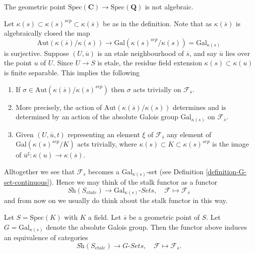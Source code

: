 \begin{example}
\label{example-stupid}
The geometric point
$\text{Spec}(\mathbf{C}) \to \text{Spec}(\mathbf{Q})$
is not algebraic.
\end{example}

\noindent
Let $\kappa(s) \subset \kappa(s)^{sep} \subset \kappa(\overline{s})$
be as in the definition. Note that as $\kappa(\overline{s})$ is algebraically
closed the map
$$
\text{Aut}(\kappa(\overline{s})/\kappa(s))
\longrightarrow
\text{Gal}(\kappa(s)^{sep}/\kappa(s)) = \text{Gal}_{\kappa(s)}
$$
is surjective. Suppose $(U, \overline{u})$ is an
etale neighbourhood of $\overline{s}$, and say $\overline{u}$ lies over
the point $u$ of $U$. Since $U \to S$ is etale, the residue field extension
$\kappa(s) \subset \kappa(u)$ is finite separable.
This implies the following
\begin{enumerate}
\item If $\sigma \in \text{Aut}(\kappa(\overline{s})/\kappa(s)^{sep})$
then $\sigma$ acts trivially on $\mathcal{F}_{\overline{s}}$.
\item More precisely, the action of
$\text{Aut}(\kappa(\overline{s})/\kappa(s))$
determines and is determined by an action of the absolute Galois group
$\text{Gal}_{\kappa(s)}$ on $\mathcal{F}_{\overline{s}}$.
\item Given $(U, \overline{u}, t)$ representing an element $\xi$ of
$\mathcal{F}_{\overline{s}}$ any element of
$\text{Gal}(\kappa(s)^{sep}/K)$ acts trivially, where
$\kappa(s) \subset K \subset \kappa(s)^{sep}$ is the image of
$\overline{u}^\sharp : \kappa(u) \to \kappa(\overline{s})$.
\end{enumerate}
Alltogether we see that $\mathcal{F}_{\overline{s}}$ becomes a
$\text{Gal}_{\kappa(s)}$-set (see
Definition \ref{definition-G-set-continuous}).
Hence we may think of the stalk functor as a functor
$$
\textit{Sh}(S_{etale}) \longrightarrow \text{Gal}_{\kappa(s)}\textit{-Sets},
\quad
\mathcal{F} \longmapsto \mathcal{F}_{\overline{s}}
$$
and from now on we usually do think about the stalk functor in this way.

\begin{theorem}
\label{theorem-equivalence-sheaves-point}
Let $S = \text{Spec}(K)$ with $K$ a field.
Let $\overline{s}$ be a geometric point of $S$.
Let $G = \text{Gal}_{\kappa(s)}$ denote the absolute Galois group.
Then the functor above induces an equivalence of categories
$$
\textit{Sh}(S_{etale}) \longrightarrow G\textit{-Sets},
\quad
\mathcal{F} \longmapsto \mathcal{F}_{\overline{s}}.
$$
\end{theorem}

